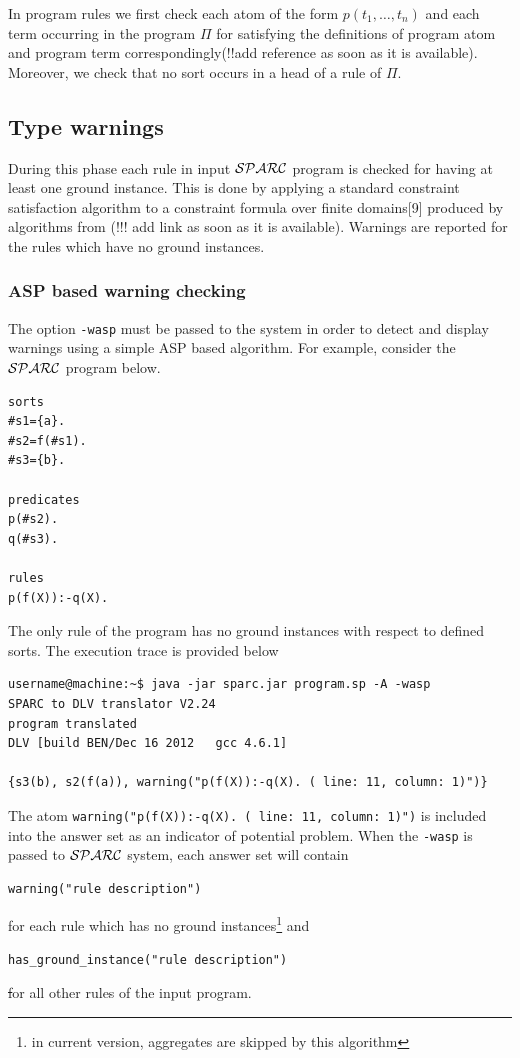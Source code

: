 \documentclass[12pt, letterpaper]{article}
\begin{document}
In program rules we first check each atom of the form $p(t_1,\dots,t_n)$ and each term occurring in the program $\Pi$ for satisfying
the definitions of program atom and program term correspondingly(!!add reference as soon as it is available). Moreover, we check that no sort occurs in a head of a rule of $\Pi$.
\subsection{Type warnings}\label{type_warnings}
During this phase each rule in input ${\cal SPARC}$ program is checked for having at least one ground instance. This is done by applying a standard constraint
satisfaction algorithm to a constraint formula over finite domains[9] produced by algorithms from (!!! add link as soon as it is available).
Warnings are reported for the rules which have no ground instances.
\subsubsection{ASP based warning checking} \label{asp_type_warnings}
The option \texttt{-wasp} must be passed to the  system  in order to detect and display warnings using a simple ASP based algorithm.
For example, consider the ${\cal SPARC}$ program below.

\begin{verbatim}
sorts
#s1={a}.
#s2=f(#s1).
#s3={b}.

predicates
p(#s2).
q(#s3).

rules
p(f(X)):-q(X).
\end{verbatim}

The only rule of the program has no ground instances with respect to defined sorts.
The execution trace is provided below
\begin{verbatim}
username@machine:~$ java -jar sparc.jar program.sp -A -wasp
SPARC to DLV translator V2.24
program translated
DLV [build BEN/Dec 16 2012   gcc 4.6.1]

{s3(b), s2(f(a)), warning("p(f(X)):-q(X). ( line: 11, column: 1)")}
\end{verbatim}

The atom \texttt{warning("p(f(X)):-q(X). ( line: 11, column: 1)")} is included into the answer set as an indicator of potential problem.
When the \texttt{-wasp} is passed to ${\cal SPARC}$ system, each answer set will contain 
\begin{verbatim}
warning("rule description") 
\end{verbatim}
for each rule which has no ground instances\footnote{in current version, aggregates are skipped by this algorithm} and 
\begin{verbatim}
has_ground_instance("rule description")
\end{verbatim}
\st
for all other rules of the input program.
\end{document}
